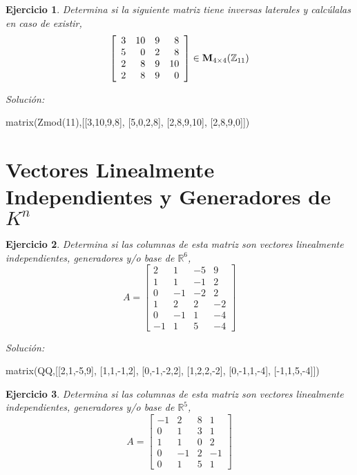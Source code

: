 \documentclass{amsart}
\newtheorem{ejer}{Ejercicio}
\begin{document}
\begin{ejer} Determina si la siguiente matriz tiene inversas laterales y calc\'ulalas en caso de existir,
\[ \left[\begin{array}{rrrr}
3 & 10 & 9 & 8 \\
5 & 0 & 2 & 8 \\
2 & 8 & 9 & 10 \\
2 & 8 & 9 & 0
\end{array}\right] \in {\bf M}_{4\times 4}({\mathbb Z}_{11})\]
\end{ejer}

{\it Soluci\'on:}

\begin{sageblock}
matrix(Zmod(11),[[3,10,9,8],
[5,0,2,8],
[2,8,9,10],
[2,8,9,0]])
\end{sageblock}


\section{Vectores Linealmente Independientes y Generadores de $K^n$}

\begin{ejer} Determina si las columnas de esta matriz son vectores linealmente independientes, generadores y/o base de ${{\mathbb R}}^{6}$,
\[ A = \left[\begin{array}{rrrr}
2 & 1 & -5 & 9 \\
1 & 1 & -1 & 2 \\
0 & -1 & -2 & 2 \\
1 & 2 & 2 & -2 \\
0 & -1 & 1 & -4 \\
-1 & 1 & 5 & -4
\end{array}\right] \]
\end{ejer}

{\it Soluci\'on:}

\begin{sageblock}
matrix(QQ,[[2,1,-5,9],
[1,1,-1,2],
[0,-1,-2,2],
[1,2,2,-2],
[0,-1,1,-4],
[-1,1,5,-4]])
\end{sageblock}



\begin{ejer} Determina si las columnas de esta matriz son vectores linealmente independientes, generadores y/o base de ${{\mathbb R}}^{5}$,
\[ A = \left[\begin{array}{rrrr}
-1 & 2 & 8 & 1 \\
0 & 1 & 3 & 1 \\
1 & 1 & 0 & 2 \\
0 & -1 & 2 & -1 \\
0 & 1 & 5 & 1
\end{array}\right] \]
\end{ejer}
\end{document}
